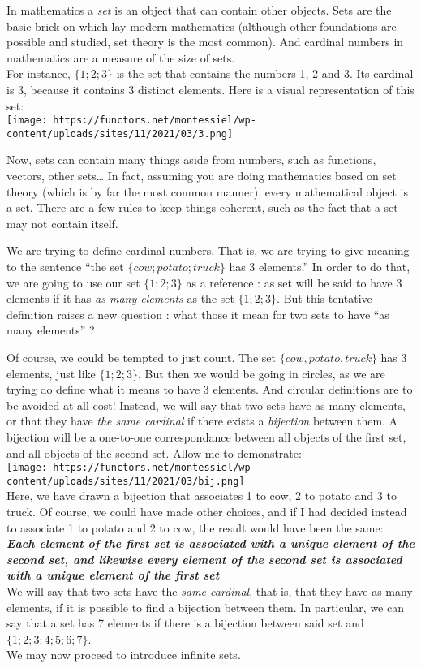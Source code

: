 \documentclass[
]{article}
\begin{document}
In mathematics a \emph{set} is an object that can contain other objects.
Sets are the basic brick on which lay modern mathematics (although other
foundations are possible and studied, set theory is the most common).
And cardinal numbers in mathematics are a measure of the size of sets.\\
For instance, \(\{1;2;3\}\) is the set that contains the numbers 1, 2
and 3. Its cardinal is 3, because it contains 3 distinct elements. Here
is a visual representation of this set:\\
\texttt{[image: https://functors.net/montessiel/wp-content/uploads/sites/11/2021/03/3.png]}

Now, sets can contain many things aside from numbers, such as functions,
vectors, other sets\ldots{} In fact, assuming you are doing mathematics
based on set theory (which is by far the most common manner), every
mathematical object is a set. There are a few rules to keep things
coherent, such as the fact that a set may not contain itself.

We are trying to define cardinal numbers. That is, we are trying to give
meaning to the sentence ``the set \(\{cow;potato; truck\}\) has 3
elements.'' In order to do that, we are going to use our set
\(\{1;2;3\}\) as a reference : as set will be said to have 3 elements if
it has \emph{as many elements} as the set \(\{1;2;3\}\). But this
tentative definition raises a new question : what those it mean for two
sets to have ``as many elements'' ?

Of course, we could be tempted to just count. The set
\(\{cow, potato, truck\}\) has 3 elements, just like \(\{1;2;3\}\). But
then we would be going in circles, as we are trying do define what it
means to have 3 elements. And circular definitions are to be avoided at
all cost! Instead, we will say that two sets have as many elements, or
that they have \emph{the same cardinal} if there exists a
\emph{bijection} between them. A bijection will be a one-to-one
correspondance between all objects of the first set, and all objects of
the second set. Allow me to demonstrate:\\
\texttt{[image: https://functors.net/montessiel/wp-content/uploads/sites/11/2021/03/bij.png]}\\
Here, we have drawn a bijection that associates 1 to cow, 2 to potato
and 3 to truck. Of course, we could have made other choices, and if I
had decided instead to associate 1 to potato and 2 to cow, the result
would have been the same:\\
\textbf{\emph{Each element of the first set is associated with a unique
element of the second set, and likewise every element of the second set
is associated with a unique element of the first set}}\\
We will say that two sets have the \emph{same cardinal}, that is, that
they have as many elements, if it is possible to find a bijection
between them. In particular, we can say that a set has 7 elements if
there is a bijection between said set and \(\{1;2;3;4;5;6;7\}\).\\
We may now proceed to introduce infinite sets.
\end{document}

